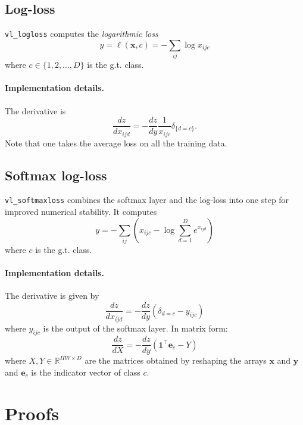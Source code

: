 \documentclass[12pt]{article}
\newcommand{\real}{\mathbb{R}}
\newcommand{\bx}{\mathbf{x}}
\newcommand{\by}{\mathbf{y}}
\newcommand{\bfe}{\mathbf{e}}
\newcommand{\bone}{\mathbf{1}}
\begin{document}
\subsection{Log-loss}\label{s:loss}

\verb!vl_logloss! computes the \emph{logarithmic loss}
\[
 y = \ell(\bx,c) = - \sum_{ij} \log x_{ijc}
\]
where $c \in \{1,2,\dots,D\}$ is the g.t\@. class.

\paragraph{Implementation details.} The derivative is
\[
\frac{dz}{dx_{ijd}} = - \frac{dz}{dy} \frac{1}{x_{ijc}} \delta_{\{d = c\}}.
\]
Note that one takes the average loss on all the training data.


\subsection{Softmax log-loss}\label{s:sfloss}

\verb!vl_softmaxloss! combines the softmax layer and the log-loss into one step for improved numerical stability. It computes
\[
y = - \sum_{ij} \left(
x_{ijc} - \log \sum_{d=1}^D e^{x_{ijd}}
\right)
\]
where $c$ is the g.t. class.

\paragraph{Implementation details.} The derivative is given by
\[
\frac{dz}{dx_{ijd}} 
= - \frac{dz}{dy} \left(\delta_{d=c} - y_{ijc}\right)
\]
where $y_{ijc}$ is the output of the softmax layer. In matrix form:
\[
\frac{dz}{dX} 
= - \frac{dz}{dy} \left(\bone^\top \bfe_c - Y\right)
\]
where $X,Y\in\real^{HW\times D}$ are the matrices obtained by reshaping the arrays
$\bx$ and $\by$ and $\bfe_c$ is the indicator vector of class $c$.





\appendix\section{Proofs}\label{s:proofs}
\end{document}
